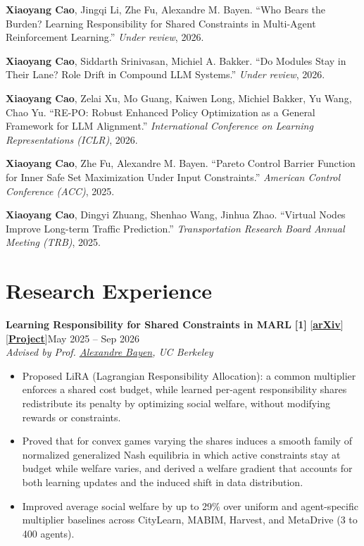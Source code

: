 \documentclass[10pt,letterpaper]{article}
\newcommand{\ulink}[2]{\href{#1}{\underline{#2}}}           %
\newcommand{\blink}[2]{[\href{#1}{\textbf{\underline{#2}}}]} %
\newcommand{\Bayen}{\ulink{https://bayen.berkeley.edu/alex-bayen}{Alexandre Bayen}}
\newcommand{\me}{\textbf{Xiaoyang Cao}}
\newcommand{\project}[3]{%
  \par{\interlinepenalty=10000 %
  {#1}\hfill #2\\
  {\itshape #3}\par}\nopagebreak\vspace{1pt}}
\newenvironment{points}{%
  \begin{itemize}[leftmargin=1.1em,itemsep=1pt,parsep=0pt,topsep=2pt,label=\textbullet,
    before={\interlinepenalty=10000}]}%
  {\end{itemize}\vspace{6pt}}
\begin{document}
\begin{enumerate}[label={[\arabic*]},leftmargin=1.8em,itemsep=4pt,parsep=0pt,topsep=0pt]
  \item \me, Jingqi Li, Zhe Fu, Alexandre M. Bayen. ``Who Bears the Burden? Learning Responsibility for Shared Constraints in Multi-Agent Reinforcement Learning.'' \textit{Under review}, 2026.
  \item \me, Siddarth Srinivasan, Michiel A. Bakker. ``Do Modules Stay in Their Lane? Role Drift in Compound LLM Systems.'' \textit{Under review}, 2026.
  \item \me, Zelai Xu, Mo Guang, Kaiwen Long, Michiel Bakker, Yu Wang, Chao Yu. ``RE-PO: Robust Enhanced Policy Optimization as a General Framework for LLM Alignment.'' \textit{International Conference on Learning Representations (ICLR)}, 2026.
  \item \me, Zhe Fu, Alexandre M. Bayen. ``Pareto Control Barrier Function for Inner Safe Set Maximization Under Input Constraints.'' \textit{American Control Conference (ACC)}, 2025.
  \item \me, Dingyi Zhuang, Shenhao Wang, Jinhua Zhao. ``Virtual Nodes Improve Long-term Traffic Prediction.'' \textit{Transportation Research Board Annual Meeting (TRB)}, 2025.
\end{enumerate}

\section{Research Experience}

\project{\textbf{Learning Responsibility for Shared Constraints in MARL} \textbf{[1]}
  \blink{https://arxiv.org/abs/2610.07491}{arXiv} \blink{https://lira-marl.github.io/}{Project}}
  {May 2025 -- Sep 2026}{Advised by Prof. \Bayen, UC Berkeley}
\begin{points}
  \item Proposed LiRA (Lagrangian Responsibility Allocation): a common multiplier enforces a shared cost budget, while learned per-agent responsibility shares redistribute its penalty by optimizing social welfare, without modifying rewards or constraints.
  \item Proved that for convex games varying the shares induces a smooth family of normalized generalized Nash equilibria in which active constraints stay at budget while welfare varies, and derived a welfare gradient that accounts for both learning updates and the induced shift in data distribution.
  \item Improved average social welfare by up to 29\% over uniform and agent-specific multiplier baselines across CityLearn, MABIM, Harvest, and MetaDrive (3 to 400 agents).
\end{points}
\end{document}
